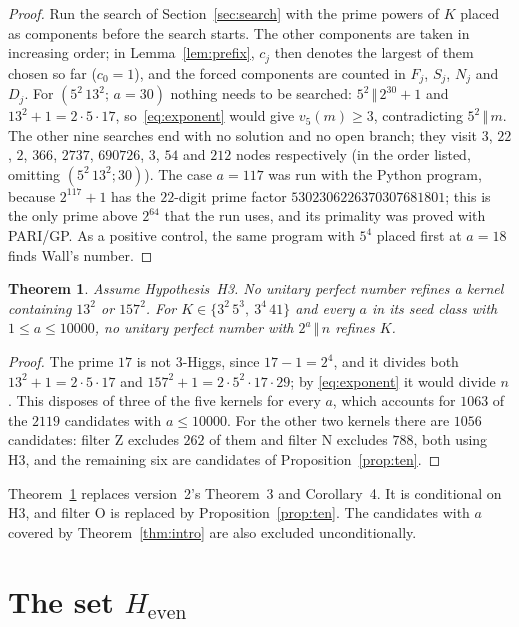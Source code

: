 \documentclass[11pt]{amsart}
\theoremstyle{plain}
\newtheorem{theorem}{Theorem}
\theoremstyle{definition}
\begin{document}
\begin{proof}
Run the search of Section~\ref{sec:search} with the prime powers of $K$
placed as components before the search starts.  The other components are
taken in increasing order; in Lemma~\ref{lem:prefix}, $c_j$ then denotes the
largest of them chosen so far ($c_0=1$), and the forced components are counted
in $F_j$, $S_j$, $N_j$ and $D_j$.  For $(5^2\,13^2;\,a=30)$
nothing needs to be searched: $5^2\,\Vert\, 2^{30}+1$ and $13^2+1=2\cdot5\cdot17$,
so~\eqref{eq:exponent} would give $v_5(m)\ge3$, contradicting $5^2\,\Vert\, m$.
The other nine searches end with no solution and no open branch; they visit
$3$, $22$, $2$, $366$, $2737$, $690726$, $3$, $54$ and $212$ nodes respectively
(in the order listed, omitting $(5^2\,13^2;30)$).  The case $a=117$ was run
with the Python program, because $2^{117}+1$ has the $22$-digit prime factor
$5302306226370307681801$; this is the only prime above $2^{64}$ that the run uses,
and its primality was proved with PARI/GP.  As a positive control, the
same program with $5^4$ placed first at $a=18$ finds Wall's number.
\end{proof}

\begin{theorem}\label{thm:conditional}
Assume Hypothesis~H3.  No unitary perfect number refines a kernel containing
$13^2$ or $157^2$.  For $K\in\{3^2\,5^3,\ 3^4\,41\}$ and every $a$ in its seed
class with $1\le a\le 10000$, no unitary perfect number with $2^a\,\Vert\, n$
refines $K$.
\end{theorem}

\begin{proof}
The prime $17$ is not 3-Higgs, since $17-1=2^4$, and it divides both
$13^2+1=2\cdot5\cdot17$ and $157^2+1=2\cdot5^2\cdot17\cdot29$; by
\eqref{eq:exponent} it would divide $n$.  This disposes of three of the five
kernels for every $a$, which accounts for $1063$ of the $2119$ candidates with
$a\le10000$.  For the other two kernels there are $1056$ candidates: filter Z
excludes $262$ of them and filter N excludes $788$, both using H3, and the
remaining six are candidates of Proposition~\ref{prop:ten}.
\end{proof}

Theorem~\ref{thm:conditional} replaces version~2's Theorem~3 and Corollary~4.
It is conditional on H3, and filter O is replaced by
Proposition~\ref{prop:ten}.  The candidates with
$a$ covered by Theorem~\ref{thm:intro} are also excluded unconditionally.

\section{The set \texorpdfstring{$H_{\mathrm{even}}$}{H even}}\label{sec:Heven}
\end{document}
